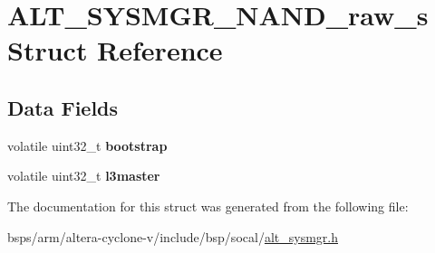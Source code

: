 \hypertarget{structALT__SYSMGR__NAND__raw__s}{}\section{A\+L\+T\+\_\+\+S\+Y\+S\+M\+G\+R\+\_\+\+N\+A\+N\+D\+\_\+raw\+\_\+s Struct Reference}
\label{structALT__SYSMGR__NAND__raw__s}
\subsection*{Data Fields}
\begin{DoxyCompactItemize}
\item 
\mbox{\label{structALT__SYSMGR__NAND__raw__s_a01aeb79faa2195c574d8ab9858274f82}} 
volatile uint32\+\_\+t {\bfseries bootstrap}
\item 
\mbox{\label{structALT__SYSMGR__NAND__raw__s_a56c85b3fa73249b333f9bdf5989d4baf}} 
volatile uint32\+\_\+t {\bfseries l3master}
\end{DoxyCompactItemize}


The documentation for this struct was generated from the following file\+:\begin{DoxyCompactItemize}
\item 
bsps/arm/altera-\/cyclone-\/v/include/bsp/socal/\mbox{\hyperlink{alt__sysmgr_8h}{alt\+\_\+sysmgr.\+h}}\end{DoxyCompactItemize}
